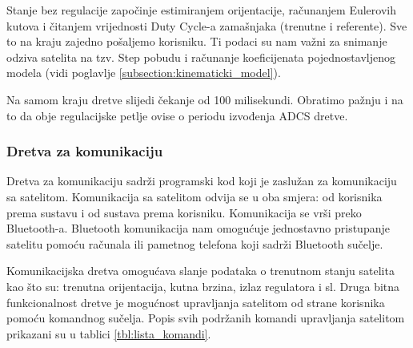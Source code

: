 \documentclass[times, utf8, diplomski, numeric]{templates/template}
\begin{document}
{{{{                Stanje bez regulacije započinje estimiranjem orijentacije, računanjem Eulerovih kutova i čitanjem vrijednosti Duty Cycle-a zamašnjaka (trenutne i referente). Sve to na kraju zajedno pošaljemo korisniku. Ti podaci su nam važni za snimanje odziva satelita na tzv. Step pobudu i računanje koeficijenata pojednostavljenog modela (vidi poglavlje \ref{subsection:kinematicki_model}).

                Na samom kraju dretve slijedi čekanje od 100 milisekundi. Obratimo pažnju i na to da obje regulacijske petlje ovise o periodu izvođenja ADCS dretve.
            }

            \subsubsection{Dretva za komunikaciju}{
                Dretva za komunikaciju sadrži programski kod koji je zaslužan za komunikaciju sa satelitom. Komunikacija sa satelitom odvija se u oba smjera: od korisnika prema sustavu i od sustava prema korisniku. Komunikacija se vrši preko Bluetooth-a. Bluetooth komunikacija nam omogućuje jednostavno pristupanje satelitu pomoću računala ili  pametnog telefona koji sadrži Bluetooth sučelje.

                Komunikacijska dretva omogućava slanje podataka o trenutnom stanju satelita kao što su: trenutna orijentacija, kutna brzina, izlaz regulatora i sl. Druga bitna funkcionalnost dretve je mogućnost upravljanja satelitom od strane korisnika pomoću komandnog sučelja. Popis svih podržanih komandi upravljanja satelitom prikazani su u tablici \ref{tbl:lista_komandi}.

}}}}
\end{document}
